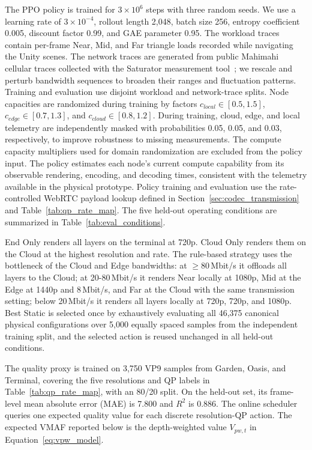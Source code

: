 \documentclass[acmsmall]{acmart}
\begin{document}
	The PPO policy is trained for $3\times10^{6}$ steps with three random seeds. We use a learning
	rate of $3\times10^{-4}$, rollout length 2,048, batch size 256,
	entropy coefficient 0.005, discount factor 0.99, and GAE parameter 0.95. The workload traces
	contain per-frame Near, Mid, and Far triangle loads recorded while navigating the Unity scenes.
	The network traces are generated from public Mahimahi cellular traces collected with the Saturator measurement tool~\cite{winstein_stochastic_2013}; we rescale and perturb bandwidth sequences to broaden their ranges and fluctuation patterns. Training and evaluation use disjoint workload and network-trace splits. Node capacities are randomized during training
	by factors $c_{local}\in[0.5,1.5]$, $c_{edge}\in[0.7,1.3]$, and
	$c_{cloud}\in[0.8,1.2]$.
	During training, cloud, edge, and local telemetry are independently masked with probabilities
	0.05, 0.05, and 0.03, respectively, to improve robustness to missing measurements. The compute
	capacity multipliers used for domain randomization are excluded from the policy input. The policy
	estimates each node's current compute capability from its observable rendering, encoding, and
	decoding times, consistent with the telemetry available in the physical prototype. Policy training and evaluation use the
	rate-controlled WebRTC payload lookup defined in Section~\ref{sec:codec_transmission} and
	Table~\ref{tab:qp_rate_map}.
	The five held-out operating conditions are summarized in Table~\ref{tab:eval_conditions}.

	End Only renders all layers on the terminal at 720p. Cloud Only renders them on the Cloud at the highest resolution and rate. The rule-based strategy uses the bottleneck of the Cloud and Edge bandwidths: at $\ge80$\,Mbit/s it offloads all layers to the Cloud; at 20-80\,Mbit/s it renders Near locally at 1080p, Mid at the Edge at 1440p and 8\,Mbit/s, and Far at the Cloud with the same transmission setting; below 20\,Mbit/s it renders all layers locally at 720p, 720p, and 1080p. Best Static is selected once by exhaustively evaluating all 46,375 canonical physical configurations over 5,000 equally spaced samples from the independent training split, and the selected action is reused unchanged in all held-out conditions.

	The quality proxy is trained on 3,750 VP9 samples from Garden, Oasis, and Terminal, covering the
	five resolutions and QP labels in Table~\ref{tab:qp_rate_map}, with an 80/20 split. On the
	held-out set, its frame-level mean absolute error (MAE) is 7.800 and
	$R^2$ is 0.886. The online scheduler queries one expected quality value for each discrete
	resolution-QP action. The expected VMAF reported below is the depth-weighted value $V_{pw,t}$ in Equation~\ref{eq:vpw_model}.
\end{document}
